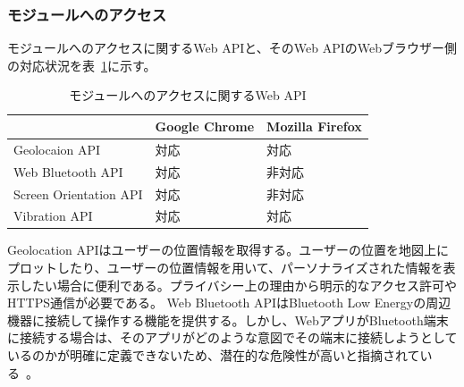 \subsubsection{モジュールへのアクセス}\label{subsubsection:モジュールへのアクセス}
モジュールへのアクセスに関するWeb APIと、そのWeb APIのWebブラウザー側の対応状況を表~\ref{table:モジュールへのアクセスに関するWeb API}に示す。
\begin{table}
  \caption{モジュールへのアクセスに関するWeb API}\label{table:モジュールへのアクセスに関するWeb API}
  \centering
  \begin{tabular}{|p{20em}|p{10em}|p{10em}|}
    \hline
    & Google Chrome & Mozilla Firefox \\ \hline
    Geolocaion API & 対応 & 対応 \\ \hline
    Web Bluetooth API & 対応 & 非対応 \\ \hline
    Screen Orientation API & 対応 & 非対応 \\ \hline
    Vibration API & 対応 & 対応 \\ \hline
  \end{tabular}
\end{table}
Geolocation APIはユーザーの位置情報を取得する。ユーザーの位置を地図上にプロットしたり、ユーザーの位置情報を用いて、パーソナライズされた情報を表示したい場合に便利である。プライバシー上の理由から明示的なアクセス許可やHTTPS通信が必要である。
Web Bluetooth APIはBluetooth Low Energyの周辺機器に接続して操作する機能を提供する。しかし、WebアプリがBluetooth端末に接続する場合は、そのアプリがどのような意図でその端末に接続しようとしているのかが明確に定義できないため、潜在的な危険性が高いと指摘されている~\cite{MozillaWebBluetooth}。
